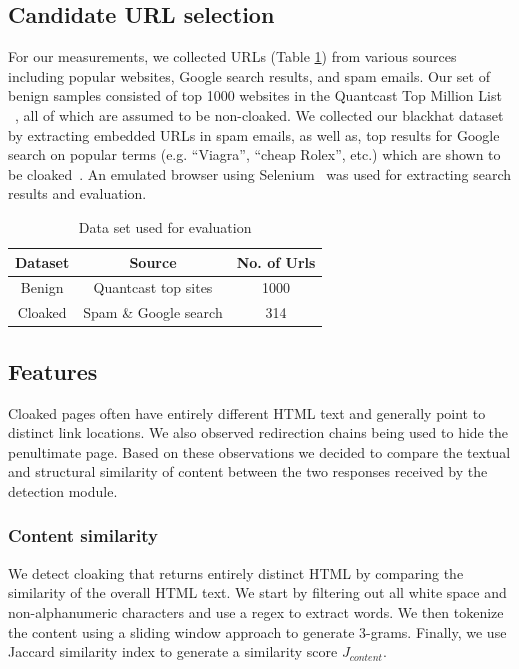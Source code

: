 \documentclass[letterpaper,twocolumn,10pt]{article}
\begin{document}
\subsection{Candidate URL selection}
For our measurements, we collected URLs (Table \ref{tab:dataset}) from various sources including popular websites, Google search results, and spam emails. Our set of benign samples consisted of top 1000 websites in the Quantcast Top Million List ~\cite{quantcast}, all of which are assumed to be non-cloaked. We collected our blackhat dataset by extracting embedded URLs in spam emails, as well as, top results for Google search on popular terms (e.g. ``Viagra'', ``cheap Rolex'', etc.) which are shown to be cloaked~\cite{cloak, Wang:2011:CDD:2046707.2046763}. An emulated browser using Selenium~\cite{selenium} was used for extracting search results and evaluation.

\begin{table}
\begin{center}
\begin{tabular}{|ccc|}
\hline
{\bf Dataset} & {\bf Source} & {\bf No. of Urls} \\
\hline
Benign & Quantcast top sites & 1000\\
Cloaked & Spam \& Google search & 314\\
\hline
\end{tabular}
\end{center}
\caption{Data set used for evaluation}\label{tab:dataset}
\end{table}


\subsection{Features}
Cloaked pages often have entirely different HTML text and generally point to distinct link locations. We also observed redirection chains being used to hide the penultimate page. Based on these observations we decided to compare the textual and structural similarity of content between the two responses received by the detection module.

\subsubsection{Content similarity}
We detect cloaking that returns entirely distinct HTML by comparing the similarity of the overall HTML text. We start by filtering out all white space and non-alphanumeric characters and use a regex to extract words. We then tokenize the content using a sliding window approach to generate 3-grams. Finally, we use Jaccard similarity index to generate a similarity score $J_{content}$.
\end{document}
